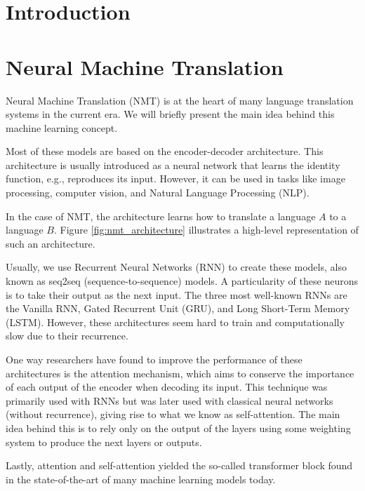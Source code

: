 \begin{abstract}
    
\end{abstract}

\section{Introduction}

\section{Neural Machine Translation}
Neural Machine Translation (NMT) is at the heart of many language translation systems in the current era. We will briefly present the main idea behind this machine learning concept.

Most of these models are based on the encoder-decoder architecture. This architecture is usually introduced as a neural network that learns the identity function, e.g., reproduces its input. However, it can be used in tasks like image processing, computer vision, and Natural Language Processing (NLP).

In the case of NMT, the architecture learns how to translate a language $A$ to a language $B$. Figure \ref{fig:nmt_architecture} illustrates a high-level representation of such an architecture.

Usually, we use Recurrent Neural Networks (RNN) to create these models, also known as seq2seq (sequence-to-sequence) models. A particularity of these neurons is to take their output as the next input. The three most well-known RNNs are the Vanilla RNN, Gated Recurrent Unit (GRU), and Long Short-Term Memory (LSTM). However, these architectures seem hard to train and computationally slow due to their recurrence.

One way researchers have found to improve the performance of these architectures is the attention mechanism, which aims to conserve the importance of each output of the encoder when decoding its input. This technique was primarily used with RNNs but was later used with classical neural networks (without recurrence), giving rise to what we know as self-attention. The main idea behind this is to rely only on the output of the layers using some weighting system to produce the next layers or outputs.

Lastly, attention and self-attention yielded the so-called transformer block found in the state-of-the-art of many machine learning models today.



